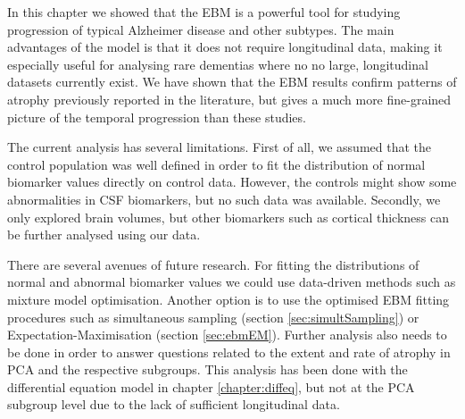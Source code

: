 In this chapter we showed that the EBM is a powerful tool for studying progression of typical Alzheimer disease and other subtypes. The main advantages of the model is that it does not require longitudinal data, making it especially useful for analysing rare dementias where no no large, longitudinal datasets currently exist. We have shown that the EBM results confirm patterns of atrophy previously reported in the literature, but gives a much more fine-grained picture of the temporal progression than these studies.

The current analysis has several limitations. First of all, we assumed that the control population was well defined in order to fit the distribution of normal biomarker values directly on control data. However, the controls might show some abnormalities in CSF biomarkers, but no such data was available. Secondly, we only explored brain volumes, but other biomarkers such as cortical thickness can be further analysed using our data. 

There are several avenues of future research. For fitting the distributions of normal and abnormal biomarker values we could use data-driven methods such as mixture model optimisation. Another option is to use the optimised EBM fitting procedures such as simultaneous sampling (section \ref{sec:simultSampling}) or Expectation-Maximisation (section \ref{sec:ebmEM}). Further analysis also needs to be done in order to answer questions related to the extent and rate of atrophy in PCA and the respective subgroups. This analysis has been done with the differential equation model in chapter \ref{chapter:diffeq}, but not at the PCA subgroup level due to the lack of sufficient longitudinal data. 

